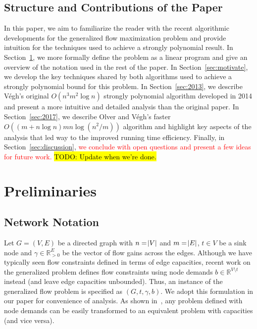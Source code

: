 \documentclass[11pt]{article}
\theoremstyle{definition}
\theoremstyle{definition}
\newcommand{\R}{\mathbb{R}}
\newcommand{\rewrite}[1]{\textcolor{red}{#1}}
\newcommand{\todo}[1]{\hl{TODO: #1}}
\begin{document}
	\subsection{Structure and Contributions of the Paper}\label{sec:structure}
	In this paper, we aim to
	familiarize the reader with the recent algorithmic developments for the
	generalized flow maximization problem and provide intuition for the techniques
	used to achieve a strongly polynomial result. In Section~\ref{sec:prelim}, we more formally
	define the problem as a linear program and give an overview of the notation
	used in the rest of the paper. In Section~\ref{sec:motivate}, we develop the key techniques
	shared by both algorithms used to achieve a strongly polynomial bound for this
	problem. In Section~\ref{sec:2013}, we describe Végh's original $O(n^3m^2 \log n)$ strongly
	polynomial algorithm developed in 2014 and present a more intuitive and
	detailed analysis than the original paper. In Section~\ref{sec:2017}, we describe Olver and
	Végh's faster $O((m + n\log n)mn\log(n^2 / m))$ algorithm and highlight key
	aspects of the analysis that led way to the improved running time efficiency.
	Finally, in Section~\ref{sec:discussion}, 
    \rewrite{we conclude with open questions and present a few ideas
	for future work.}
	\todo{Update when we're done.}
    
\section{Preliminaries}\label{sec:prelim}

	\subsection{Network Notation}\label{sec:notation}
	Let $G=(V,E)$ be a directed graph with $n=\abs{V}$ and $m=\abs{E}$,
	$t \in V$ be a sink node and $\gamma \in \R_{>0}^E$ be the vector of flow gains
	across the edges. Although we have typically seen flow constraints defined in terms of
	edge capacities, recent work on the generalized problem defines flow
	constraints using node demands $b \in \R^{V \setminus t}$ instead (and leave
	edge capacities unbounded). Thus, an instance of the generalized flow problem
	is specified as $(G, t, \gamma, b)$.
	We adopt this formulation in our paper for
	convenience of analysis. As shown in~\cite{Vegh2013}, any problem defined with
	node demands can be easily transformed to an equivalent problem with
	capacities (and vice versa). 
\end{document}
